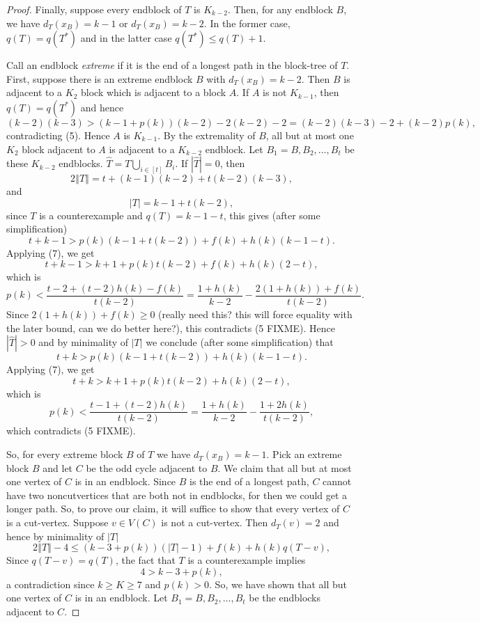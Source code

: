 \documentclass[12pt]{article}
\theoremstyle{plain}
\theoremstyle{definition}
\theoremstyle{remark}
\newcommand{\card}[1]{\left|#1\right|}
\newcommand{\size}[1]{\left\Vert#1\right\Vert}
\newcommand{\irange}[1]{\left[#1\right]}
\newcommand{\parens}[1]{\left( #1 \right)}
\begin{document}
\begin{proof}
		 Finally, suppose every endblock of $T$ is $K_{k-2}$.  Then, for any endblock $B$, we have $d_T(x_B) = k - 1$ or $d_T(x_B) = k-2$.  In the former case, $q(T) = q(T^*)$ and in the latter case $q(T^*) \le q(T) + 1$.  
		 
		 Call an endblock \emph{extreme} if it is the end of a longest path in the block-tree of $T$.  First, suppose there is an extreme endblock $B$ with $d_T(x_B) = k-2$.  Then $B$ is adjacent to a $K_2$ block which is adjacent to a block $A$.
		 If $A$ is not $K_{k-1}$, then $q(T) = q(T^*)$ and hence
		 \[(k-2)(k-3) > (k-1 + p(k))(k-2) - 2(k-2) - 2 = (k-2)(k-3) - 2 + (k-2)p(k),\]
		 contradicting (5).  Hence $A$ is $K_{k-1}$.  By the extremality of $B$, all but at most one $K_2$ block adjacent to $A$ is adjacent to a $K_{k-2}$ endblock.  Let $B_1 = B, B_2, \ldots, B_t$ be these $K_{k-2}$ endblocks.
		 $\hat{T} = T \bigcup_{i \in \irange{t}} B_i$.  If $\card{\hat{T}} = 0$, then
		 \[2\size{T} = t + (k-1)(k-2) + t(k-2)(k-3),\]
		 and
		 \[\card{T} = k-1 + t(k-2),\]
		 since $T$ is a counterexample and $q(T) = k-1 - t$, this gives (after some simplification)
		 \[t + k - 1 > p(k)(k-1 + t(k-2)) + f(k) + h(k)(k-1-t).\]
		 Applying (7), we get
		 \[t + k-1 > k+1 + p(k)t(k-2) + f(k) + h(k)(2-t),\]
		 which is
		 \[p(k) < \frac{t-2 + (t-2)h(k) - f(k)}{t(k-2)} = \frac{1 + h(k)}{k-2} - \frac{2(1 + h(k)) + f(k)}{t(k-2)}.\]
		 Since $2(1+ h(k)) + f(k) \ge 0$ (really need this? this will force equality with the later bound, can we do better here?), this contradicts (5 FIXME).  Hence $\card{\hat{T}} > 0$ and by minimality of $\card{T}$ we conclude (after some simplification) that
		 \[t + k  > p(k)(k-1 + t(k-2)) + h(k)(k-1-t).\]
		  Applying (7), we get
		  \[t + k > k+1 + p(k)t(k-2) + h(k)(2-t),\]
		  which is
		  \[p(k) < \frac{t-1 + (t-2)h(k)}{t(k-2)} = \frac{1 + h(k)}{k-2} - \frac{1 + 2h(k)}{t(k-2)},\]
		  which contradicts (5 FIXME).
		  
		  So, for every extreme block $B$ of $T$ we have $d_T(x_B) = k - 1$.  Pick an extreme block $B$ and let $C$ be the odd cycle adjacent to $B$.  We claim that all but at most one vertex of $C$ is in an endblock.  Since $B$ is the end of a longest path, $C$ cannot have two noncutvertices that are both not in endblocks, for then we could get a longer path.  So, to prove our claim, it will suffice to show that every vertex of $C$ is a cut-vertex.  Suppose $v \in V(C)$ is not a cut-vertex.  Then $d_T(v) = 2$ and hence by minimality of $\card{T}$
		 \[2\size{T} - 4 \le (k-3 + p(k))\parens{\card{T} - 1} + f(k) + h(k)q(T - v),\]
		 Since $q(T-v) = q(T)$, the fact that $T$ is a counterexample implies
		 \[4 > k-3 + p(k),\]
		 a contradiction since $k \ge K \ge 7$ and $p(k) > 0$.  So, we have shown that all but one vertex of $C$ is in an endblock.  Let $B_1 = B, B_2, \ldots, B_t$ be the endblocks adjacent to $C$.  
		 

\end{proof}
\end{document}
